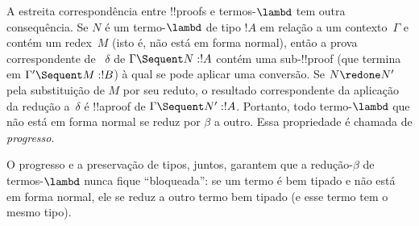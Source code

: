 \documentclass[../../../include/open-logic-section]{subfiles}
\begin{document}
A estreita correspondência entre !!{proof}s e termos-$\lambd$ tem outra
consequência. Se $N$ é um termo-$\lambd$ de tipo $!A$ em relação a um
contexto~$\Gamma$ e contém um redex~$M$ (isto é, não está em forma
normal), então a prova correspondente de ~$\delta$ de
$\Gamma \Sequent N : !A$ contém uma sub-!!{proof} (que termina em
$\Gamma' \Sequent M: !B$) à qual se pode aplicar uma conversão. Se
$N \redone N'$ pela substituição de $M$ por seu reduto, o resultado
correspondente da aplicação da redução a~$\delta$ é !!a{proof} de
$\Gamma \Sequent N' : !A$. Portanto, todo termo-$\lambd$ que não está em
forma normal se reduz por $\beta$ a outro. Essa propriedade é chamada de
\emph{progresso}.

O progresso e a preservação de tipos, juntos, garantem que a
redução-$\beta$ de termos-$\lambd$ nunca fique ``bloqueada'': se um termo
é bem tipado e não está em forma normal, ele se reduz a outro termo bem
tipado (e esse termo tem o mesmo tipo).
\end{document}
